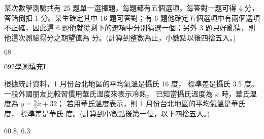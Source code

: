 \begin{QUESTIONS}
\begin{QUESTION}
\begin{QBODY}
            某次數學測驗共有 25 題單一選擇題，每題都有五個選項，每答對一題可得 4 分，答錯倒扣 1 分。某生確定其中 16 題可答對；有 6 題他確定五個選項中有兩個選項不正確，因此這 6 題他就從剩下的選項中分別猜選一個；另外 3 題只好亂猜，則他這次測驗得分之期望值為 
            \TCNBOX{\TCN\TCN} 分。(計算到整數為止，小數點以後四捨五入。)
        \end{QBODY}
        \begin{QFROMS}
        \end{QFROMS}
        \begin{QTAGS}\end{QTAGS}
        \begin{QANS}
            $68$
        \end{QANS}
        \begin{QSOLLIST}
        \end{QSOLLIST}
        \begin{QEMPTYSPACE}
        \end{QEMPTYSPACE}
    \end{QUESTION}
    \begin{QUESTION}
        \begin{ExamInfo}{092}{學測}{填充}{I}
        \end{ExamInfo}
        \begin{ExamAnsRateInfo}{38}{70}{35}{9}
        \end{ExamAnsRateInfo}
        \begin{QBODY}
            根據統計資料，1 月份台北地區的平均氣溫是攝氏 16 度，
            標準差是攝氏 3.5 度。一般外國朋友比較習慣用華氏溫度來表示冷熱，
            已知當攝氏溫度為 $x$ 時，華氏溫度為 $y =\frac{9}{5}x + 32$；
            若用華氏溫度表示，則 1 月份台北地區的平均氣溫是華氏 
             度，
            標準差是華氏 
             度。(計算到小數點後第一位，以下四捨五入。)
        \end{QBODY}
        \begin{QFROMS}
        \end{QFROMS}
        \begin{QTAGS}\end{QTAGS}
        \begin{QANS}
            $60.8$, $6.3$
        \end{QANS}
        \begin{QSOLLIST}
        \end{QSOLLIST}
        \begin{QEMPTYSPACE}
        \end{QEMPTYSPACE}
    \end{QUESTION}
\end{QUESTIONS}
